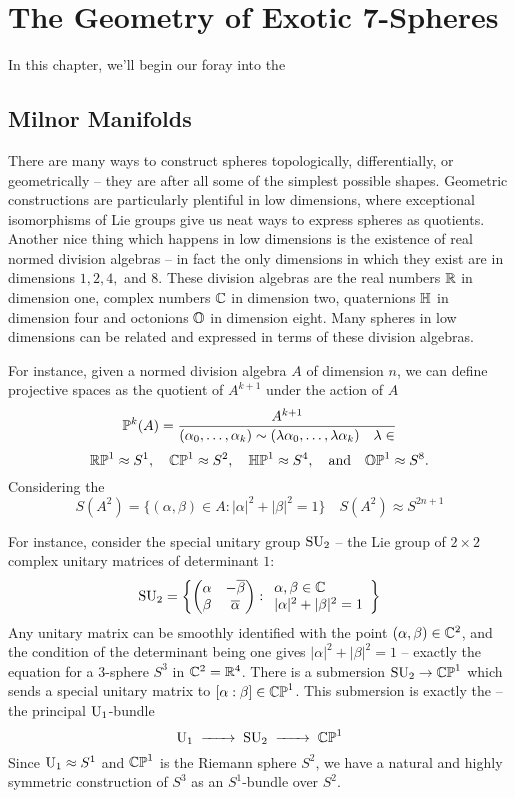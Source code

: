 \chapter{The Geometry of Exotic 7-Spheres}

In this chapter, we'll begin our foray into the 

\section{Milnor Manifolds}

There are many ways to construct spheres topologically, differentially, or geometrically -- they are after all some of the simplest possible shapes. Geometric constructions are particularly plentiful in low dimensions, where exceptional isomorphisms of Lie groups give us neat ways to express spheres as quotients. Another nice thing which happens in low dimensions is the existence of real normed division algebras -- in fact the only dimensions in which they exist are in dimensions $1,2,4,$ and $8$. These division algebras are the real numbers $\R$ in dimension one, complex numbers $\C$ in dimension two, quaternions $\HH$ in dimension four and octonions $\OO$ in dimension eight. Many spheres in low dimensions can be related and expressed in terms of these division algebras.

For instance, given a normed division algebra $A$ of dimension $n$, we can define projective spaces as the quotient of $A^{k+1}$ under the action of $A$
\[
  \P^k(A) = \frac{A^{k+1}}{(\alpha_0,\ldots, \alpha_k)\sim (\lambda\alpha_0,\ldots,\lambda\alpha_k)\quad \lambda\in }
\]
\[
    \RP^1\approx S^1,\quad
    \CP^1\approx S^2,\quad
    \HP^1\approx S^4,\quad\textrm{and}\quad
    \OP^1\approx S^8.
\]
Considering the 
\[
  S(A^2) = \{(\alpha,\beta)\in A : |\alpha|^2+|\beta|^2=1\} \quad S(A^2)\approx S^{2n+1}
\]



For instance, consider the special unitary group $\SU_2$ -- the Lie group of $2\times 2$ complex unitary matrices of determinant $1$:
\[
	\SU_2 = \left\{
	\begin{pmatrix} \alpha & -\overline{\beta}\\ \beta & \overline{\alpha}\end{pmatrix}
	:
	\begin{array}{l}\alpha,\beta\in \C\\|\alpha|^2+|\beta|^2=1\end{array}
	\right\}
\]
Any unitary matrix can be smoothly identified with the point $(\alpha,\beta)\in \C^2$, and the 
condition of the determinant being one gives $|\alpha|^2+|\beta|^2=1$ -- exactly the equation for a $3$-sphere $S^3$ in $\C^2=\R^4$. There is a submersion $\SU_2 \to \CP^1$ which sends a special unitary matrix to $[\alpha:\beta]\in \CP^1$. This submersion is exactly the  -- the principal $\U_1$-bundle
\[
    \U_1 \lkxto \SU_2 \lkxto \CP^1
\]
Since $\U_1\cong S^1$ and $\CP^1$ is the Riemann sphere $S^2$, we have a natural and highly symmetric construction of $S^3$ as an $S^1$-bundle over $S^2$.

